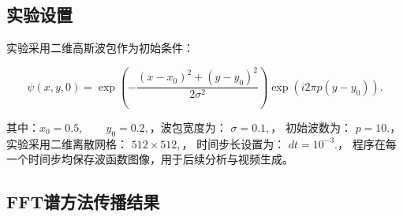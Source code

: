 \documentclass[UTF8,a4paper,12pt]{ctexart}
\begin{document}
\subsection{实验设置}

实验采用二维高斯波包作为初始条件：

\[
\psi(x,y,0)
=
\exp\left(
-\frac{(x-x_0)^2+(y-y_0)^2}{2\sigma^2}
\right)
\exp\left(
i2\pi p(y-y_0)
\right).
\]

其中：$
x_0=0.5,
\qquad
y_0=0.2,
$，波包宽度为：
$\sigma=0.1,$，
初始波数为：
$p=10.$，
实验采用二维离散网格：
$512\times512,$，
时间步长设置为：
$dt=10^{-3}.$，
程序在每一个时间步均保存波函数图像，用于后续分析与视频生成。

\subsection{FFT谱方法传播结果}
\end{document}
